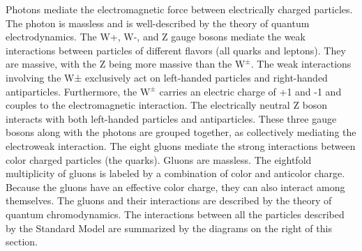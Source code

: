 Photons mediate the electromagnetic force between electrically charged particles. The photon is massless and is well-described by the theory of quantum electrodynamics.
The W+, W-, and Z gauge bosons mediate the weak interactions between particles of different flavors (all quarks and leptons). They are massive, with the Z being more massive than the $\textrm{W}^{\pm}$. The weak interactions involving the W± exclusively act on left-handed particles and right-handed antiparticles. Furthermore, the $\textrm{W}^{\pm}$ carries an electric charge of +1 and -1 and couples to the electromagnetic interaction. The electrically neutral Z boson interacts with both left-handed particles and antiparticles. These three gauge bosons along with the photons are grouped together, as collectively mediating the electroweak interaction.
The eight gluons mediate the strong interactions between color charged particles (the quarks). Gluons are massless. The eightfold multiplicity of gluons is labeled by a combination of color and anticolor charge. Because the gluons have an effective color charge, they can also interact among themselves. The gluons and their interactions are described by the theory of quantum chromodynamics.
The interactions between all the particles described by the Standard Model are summarized by the diagrams on the right of this section.

